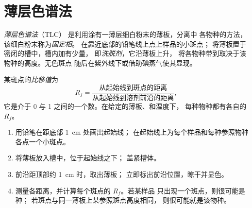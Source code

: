 \section{薄层色谱法}

\begin{definition}[薄层色谱法]\label{def:g10:chemical-species:tlc}
\emph{薄层色谱法}（TLC）
是利用涂有一薄层细白粉末的薄板，分离中
各物种的方法，该细白粉末称为\emph{固定相}。
在靠近底部的铅笔线上点上样品的小斑点；
将薄板置于密闭的槽中，槽内加有少量，
即\emph{洗脱剂}，它沿薄板上升，
将各物种带到取决于该物种的高度。无色斑点
随后在紫外线下或借助碘蒸气使其显现。
\end{definition}

\begin{definition}[比移值]\label{def:g10:chemical-species:retention-factor}
某斑点的\emph{比移值}为
\[
  R_f = \frac{\text{从起始线到斑点的距离}}
             {\text{从起始线到溶剂前沿的距离}},
\]
它是介于 0 与 1 之间的一个数。在给定的薄板、和温度下，
每种物种都有各自的 $R_f$。
\end{definition}

\begin{method}[薄层色谱的操作与读数]\label{met:g10:chemical-species:tlc}
\begin{enumerate}
  \item 用铅笔在距底部 \qty{1}{cm} 处画出起始线；
        在起始线上为每个样品和每种参照物种
        各点一个小斑点。
  \item 将薄板放入槽中，位于起始线之下；
        盖紧槽体。
  \item {}前沿距顶部约 \qty{1}{cm} 时，取出薄板；
        立即标出前沿位置，晾干并显色。
  \item 测量各距离，并计算每个斑点的 $R_f$。若某样品
        只出现一个斑点，则很可能是种；
        若斑点与同一薄板上某参照斑点高度相同，
        则很可能就是该物种。
\end{enumerate}
\end{method}

